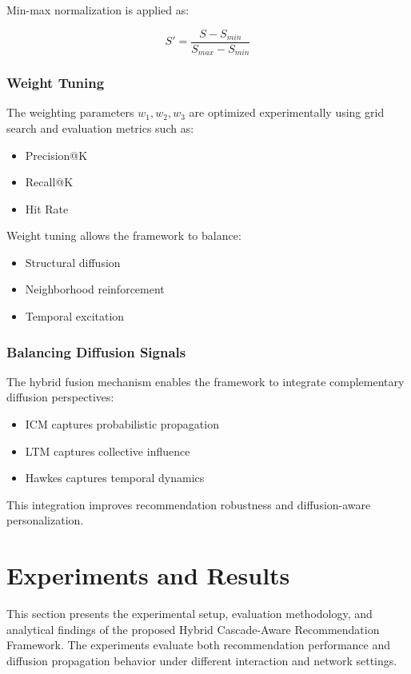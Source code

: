\documentclass{article}
\begin{document}
Min-max normalization is applied as:

$$
S' = \frac{S - S_{min}}{S_{max} - S_{min}}
$$

\subsubsection{Weight Tuning}

The weighting parameters $w_1, w_2, w_3$ are optimized experimentally using grid search and evaluation metrics such as:
\begin{itemize}
\item Precision@K
\item Recall@K
\item Hit Rate
\end{itemize}

Weight tuning allows the framework to balance:
\begin{itemize}
\item Structural diffusion
\item Neighborhood reinforcement
\item Temporal excitation
\end{itemize}

\subsubsection{Balancing Diffusion Signals}

The hybrid fusion mechanism enables the framework to integrate complementary diffusion perspectives:
\begin{itemize}
\item ICM captures probabilistic propagation
\item LTM captures collective influence
\item Hawkes captures temporal dynamics
\end{itemize}

This integration improves recommendation robustness and diffusion-aware personalization.

\section{Experiments and Results}

This section presents the experimental setup, evaluation methodology, and analytical findings of the proposed Hybrid Cascade-Aware Recommendation Framework. The experiments evaluate both recommendation performance and diffusion propagation behavior under different interaction and network settings.
\end{document}
